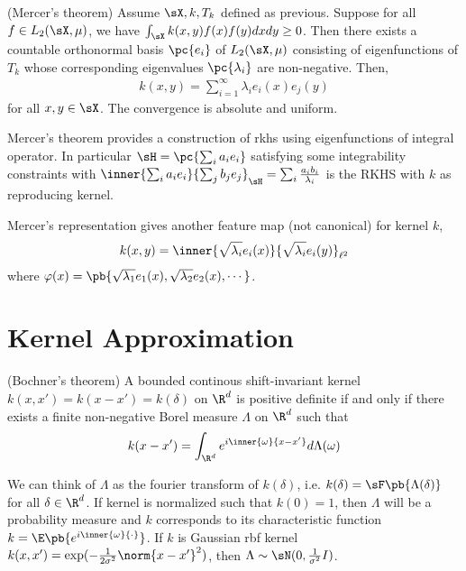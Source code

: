 \documentclass[11pt]{article}
\begin{document}
\begin{theorem}
    (Mercer's theorem) Assume $\sX,k,T_k$ defined as previous. Suppose for all $f\in L_2(\sX,\mu)$, we have $\int_{\sX} k(x,y) f(x)f(y) dxdy \geq 0$. Then there exists a countable orthonormal basis $\pc{e_i}$ of $L_2(\sX,\mu)$ consisting of eigenfunctions of $T_k$ whose corresponding eigenvalues $\pc{\lambda_i}$ are non-negative. Then,
    \begin{align}
        k(x,y)
            = \sum_{i=1}^{\infty} \lambda_i e_i(x) e_j(y)
    \end{align}
    for all $x,y\in\sX$. The convergence is absolute and uniform.
\end{theorem}

Mercer's theorem provides a construction of rkhs using eigenfunctions of integral operator. In particular $\sH = \pc{\sum_i a_i e_i}$ satisfying some integrability constraints with $\inner{\sum_i a_ie_i}{\sum_j b_j e_j}_{\sH} = \sum_i \frac{ a_ib_i}{\lambda_i}$ is the RKHS with $k$ as reproducing kernel.

Mercer's representation gives another feature map (not canonical) for kernel $k$,
\begin{align}
    k(x,y) 
        = \inner{\sqrt{\lambda_i}e_i(x)}{\sqrt{\lambda_i}e_i(y)}_{\ell^2}
\end{align}
where $\varphi(x) = \pb{ \sqrt{\lambda_1} e_1(x), \sqrt{\lambda_2} e_2(x), \cdots }$.

\section{Kernel Approximation}


\begin{theorem}
    (Bochner's theorem) A bounded continous shift-invariant kernel $k(x,x') = k(x-x')=k(\delta)$ on $\R^d$ is positive definite if and only if there exists a finite non-negative Borel measure $\Lambda$ on $\R^d$ such that 
    \begin{align}
        k(x-x')
            = \int_{\R^d} e^{i\inner{\omega}{x-x'}} d\Lambda(\omega)
        \label{eq:bochner}
    \end{align}
\end{theorem}

We can think of $\Lambda$ as the fourier transform of $k(\delta)$, i.e. $k(\delta) = \sF\pb{\Lambda(\delta)}$ for all $\delta\in\R^d$. If kernel is normalized such that $k(0)=1$, then $\Lambda$ will be a probability measure and $k$ corresponds to its characteristic function $k = \E\pb{ e^{i\inner{\omega}{\cdot}} }$. If $k$ is Gaussian rbf kernel $k(x,x') = \exp(-\frac{1}{2\sigma^2}\norm{x-x'}^2)$, then $\Lambda \sim \sN(0,\frac{1}{\sigma^2}I)$. 
\end{document}
